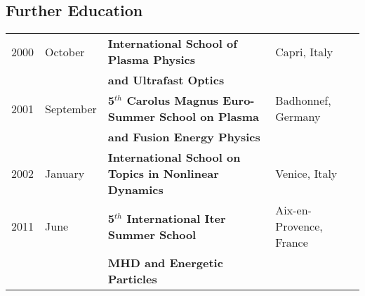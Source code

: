 \subsection{Further Education}
\begin{tabular}{llll}
2000& October & \textbf{International School of Plasma Physics } &
Capri, Italy\\
 & &\textbf{and
  Ultrafast Optics} & \\
2001& September & \textbf{5$^{th}$ Carolus Magnus Euro-Summer School on
  Plasma } & Badhonnef, Germany \\
 & &\textbf{and Fusion Energy Physics} & \\
2002& January & \textbf{International School on Topics in Nonlinear
  Dynamics}& Venice, Italy \\
2011& June & \textbf{5$^{th}$ International Iter Summer School }&
Aix-en-Provence, France \\
  & & \textbf{MHD and Energetic Particles } & 
\end{tabular}
